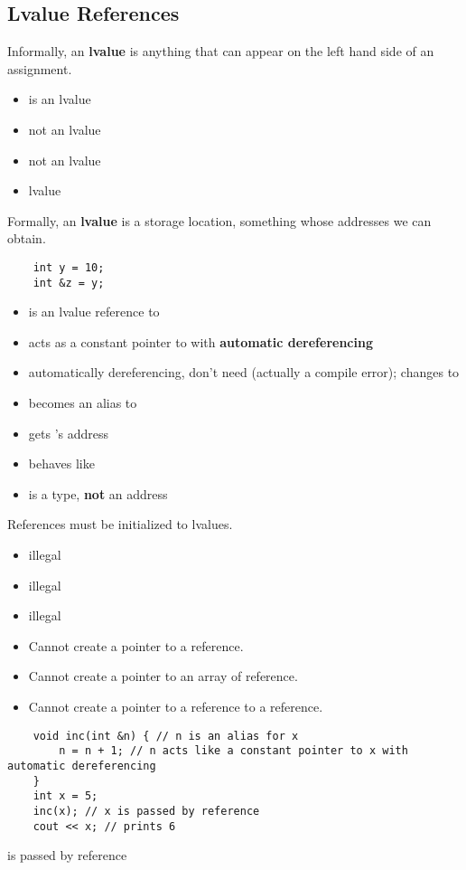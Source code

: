 \subsection{Lvalue References}
Informally, an \textbf{lvalue} is anything that can appear on the left hand side of
an assignment.
\begin{itemize}
    \item {} \textrightarrow{}  is an lvalue
    \item {} \textrightarrow{} not an lvalue
    \item {} \textrightarrow{} not an lvalue
    \item {} \textrightarrow{}  lvalue
\end{itemize}
Formally, an \textbf{lvalue} is a storage location, something whose addresses we
can obtain.
\begin{lstlisting}
    int y = 10;
    int &z = y;
\end{lstlisting}
\begin{itemize}
    \item {} is an lvalue reference to 
    \item {} acts as a constant pointer to  with
          \textbf{automatic dereferencing}
    \item {} \textrightarrow{} automatically dereferencing,
          don't need  (actually a compile error); changes  to 
    \item {} becomes an alias to 
    \item {} \textrightarrow{} gets 's address
    \item {} behaves like 
    \item {} is a type, \textbf{not} an address
\end{itemize}
References must be initialized to lvalues.
\begin{itemize}
    \item {} \textrightarrow{} illegal
    \item {} \textrightarrow{} illegal
    \item {} \textrightarrow{} illegal
\end{itemize}
\begin{itemize}
    \item Cannot create a pointer to a reference.
    \item Cannot create a pointer to an array of reference.
    \item Cannot create a pointer to a reference to a reference.
\end{itemize}
\begin{lstlisting}
    void inc(int &n) { // n is an alias for x
        n = n + 1; // n acts like a constant pointer to x with automatic dereferencing
    }
    int x = 5;
    inc(x); // x is passed by reference
    cout << x; // prints 6
\end{lstlisting}
 \textrightarrow{}  is passed by reference
